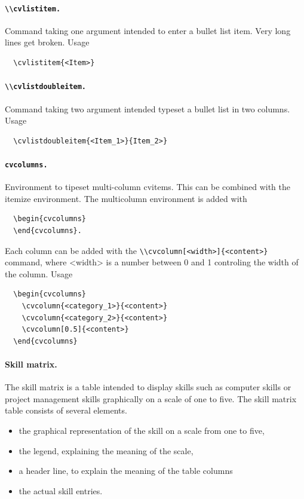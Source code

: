 \documentclass[a4paper,11pt]{article}
\newcommand{\code}[1]{\lstinline!#1!}
\begin{document}
\paragraph{\code{\\cvlistitem.}} Command taking one argument intended to enter a bullet list item.
Very long lines get broken. Usage
\begin{lstlisting}
  \cvlistitem{<Item>}
\end{lstlisting}

\paragraph{\code{\\cvlistdoubleitem.}} Command taking two argument intended typeset a bullet list in two columns. Usage
\begin{lstlisting}
  \cvlistdoubleitem{<Item_1>}{Item_2>}
\end{lstlisting}

\paragraph{\code{cvcolumns.}} Environment to tipeset multi-column cvitems. This can be combined with the itemize environment.
The multicolumn environment is added with
\begin{lstlisting}
  \begin{cvcolumns}
  \end{cvcolumns}.
\end{lstlisting}
Each column can be added with the \code{\\cvcolumn[<width>]{<content>}} command, where <width> is a number between 0 and 1 controling the width of the column.
Usage
\begin{lstlisting}
  \begin{cvcolumns}
    \cvcolumn{<category_1>}{<content>}
    \cvcolumn{<category_2>}{<content>}
    \cvcolumn[0.5]{<content>}
  \end{cvcolumns}
\end{lstlisting}

\paragraph{Skill matrix.} The skill matrix is a table intended to display skills such as computer skills or project management skills graphically on a scale of one to five.
The skill matrix table consists of several elements.
\begin{itemize}
  \item the graphical representation of the skill on a scale from one to five,
  \item the legend, explaining the meaning of the scale,
  \item a header line, to explain the meaning of the table columns
  \item the actual skill entries.
\end{itemize}\medskip
\end{document}
